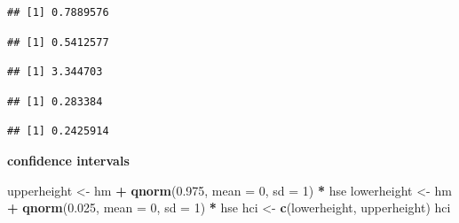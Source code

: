\documentclass[]{article}
\newenvironment{Shaded}{\begin{snugshade}}{\end{snugshade}}
\newcommand{\KeywordTok}[1]{\textcolor[rgb]{0.13,0.29,0.53}{\textbf{#1}}}
\newcommand{\DataTypeTok}[1]{\textcolor[rgb]{0.13,0.29,0.53}{#1}}
\newcommand{\DecValTok}[1]{\textcolor[rgb]{0.00,0.00,0.81}{#1}}
\newcommand{\FloatTok}[1]{\textcolor[rgb]{0.00,0.00,0.81}{#1}}
\newcommand{\StringTok}[1]{\textcolor[rgb]{0.31,0.60,0.02}{#1}}
\newcommand{\OperatorTok}[1]{\textcolor[rgb]{0.81,0.36,0.00}{\textbf{#1}}}
\newcommand{\NormalTok}[1]{#1}
\begin{document}
\begin{verbatim}
## [1] 0.7889576
\end{verbatim}

\begin{Shaded}
\end{Shaded}

\begin{verbatim}
## [1] 0.5412577
\end{verbatim}

\begin{Shaded}
\end{Shaded}

\begin{verbatim}
## [1] 3.344703
\end{verbatim}

\begin{Shaded}
\end{Shaded}

\begin{verbatim}
## [1] 0.283384
\end{verbatim}

\begin{Shaded}
\end{Shaded}

\begin{verbatim}
## [1] 0.2425914
\end{verbatim}

\textbf{confidence intervals}

\begin{Shaded}
\begin{Highlighting}[]
\NormalTok{upperheight <-}\StringTok{ }\NormalTok{hm }\OperatorTok{+}\StringTok{ }\KeywordTok{qnorm}\NormalTok{(}\FloatTok{0.975}\NormalTok{, }\DataTypeTok{mean =} \DecValTok{0}\NormalTok{, }\DataTypeTok{sd =} \DecValTok{1}\NormalTok{) }\OperatorTok{*}\StringTok{ }\NormalTok{hse}
\NormalTok{lowerheight <-}\StringTok{ }\NormalTok{hm }\OperatorTok{+}\StringTok{ }\KeywordTok{qnorm}\NormalTok{(}\FloatTok{0.025}\NormalTok{, }\DataTypeTok{mean =} \DecValTok{0}\NormalTok{, }\DataTypeTok{sd =} \DecValTok{1}\NormalTok{) }\OperatorTok{*}\StringTok{ }\NormalTok{hse }
\NormalTok{hci <-}\StringTok{ }\KeywordTok{c}\NormalTok{(lowerheight, upperheight)}
\NormalTok{hci}
\end{Highlighting}
\end{Shaded}
\end{document}
